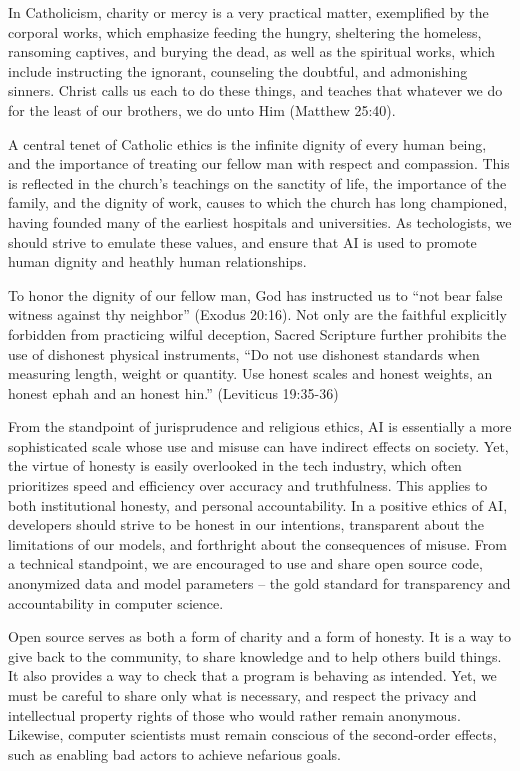 \documentclass[sigplan,nonacm]{acmart}\settopmatter{printfolios=false,printccs=false,printacmref=false}
\begin{document}
  In Catholicism, charity or mercy is a very practical matter, exemplified by the corporal works, which emphasize feeding the hungry, sheltering the homeless, ransoming captives, and burying the dead, as well as the spiritual works, which include instructing the ignorant, counseling the doubtful, and admonishing sinners. Christ calls us each to do these things, and teaches that whatever we do for the least of our brothers, we do unto Him (Matthew 25:40).

  A central tenet of Catholic ethics is the infinite dignity of every human being, and the importance of treating our fellow man with respect and compassion. This is reflected in the church's teachings on the sanctity of life, the importance of the family, and the dignity of work, causes to which the church has long championed, having founded many of the earliest hospitals and universities. As techologists, we should strive to emulate these values, and ensure that AI is used to promote human dignity and heathly human relationships.

  To honor the dignity of our fellow man, God has instructed us to ``not bear false witness against thy neighbor'' (Exodus 20:16). Not only are the faithful explicitly forbidden from practicing wilful deception, Sacred Scripture further prohibits the use of dishonest physical instruments, ``Do not use dishonest standards when measuring length, weight or quantity. Use honest scales and honest weights, an honest ephah and an honest hin.'' (Leviticus 19:35-36)

  From the standpoint of jurisprudence and religious ethics, AI is essentially a more sophisticated scale whose use and misuse can have indirect effects on society. Yet, the virtue of honesty is easily overlooked in the tech industry, which often prioritizes speed and efficiency over accuracy and truthfulness. This applies to both institutional honesty, and personal accountability. In a positive ethics of AI, developers should strive to be honest in our intentions, transparent about the limitations of our models, and forthright about the consequences of misuse. From a technical standpoint, we are encouraged to use and share open source code, anonymized data and model parameters -- the gold standard for transparency and accountability in computer science.

  Open source serves as both a form of charity and a form of honesty. It is a way to give back to the community, to share knowledge and to help others build things. It also provides a way to check that a program is behaving as intended. Yet, we must be careful to share only what is necessary, and respect the privacy and intellectual property rights of those who would rather remain anonymous. Likewise, computer scientists must remain conscious of the second-order effects, such as enabling bad actors to achieve nefarious goals.
\end{document}

